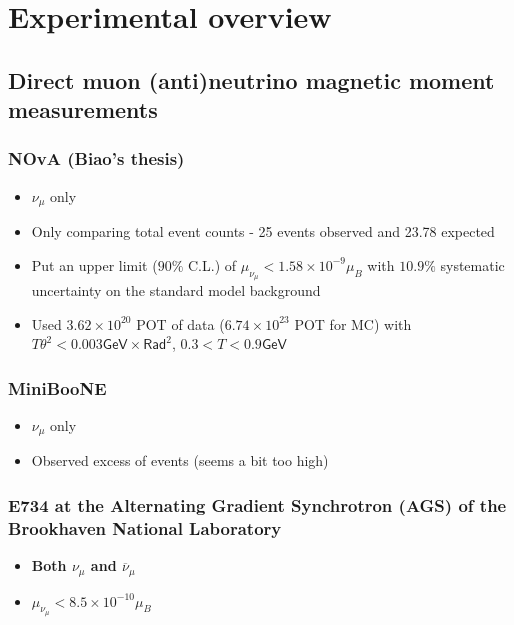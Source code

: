 \section{Experimental overview}

\subsection{Direct muon (anti)neutrino magnetic moment measurements}
\subsubsection{NOvA (Biao's thesis)}
\begin{itemize}
    \item $\nu_\mu$ only
    \item Only comparing total event counts - 25 events observed and 23.78 expected
    \item Put an upper limit ($90\%$ C.L.) of $\mu_{\nu_\mu}<1.58\times 10^{-9}\mu_B$ with $10.9\%$ systematic uncertainty on the standard model background
    \item Used $3.62\times 10^{20}$ POT of data ($6.74\times 10^{23}$ POT for MC) with $T\theta^2<0.003\textsf{GeV}\times\textsf{Rad}^2$, $0.3<T<0.9\textsf{GeV}$
\end{itemize}

\subsubsection{MiniBooNE}
\begin{itemize}
    \item $\nu_\mu$ only
    \item Observed excess of events (seems a bit too high)
\end{itemize}

\subsubsection{E734 at the Alternating Gradient Synchrotron (AGS) of the Brookhaven National Laboratory}
\begin{itemize}
    \item \textbf{Both $\nu_\mu$ and $\overline{\nu}_\mu$}
    \item $\mu_{\nu_\mu}<8.5\times 10^{-10}\mu_B$
\end{itemize}

